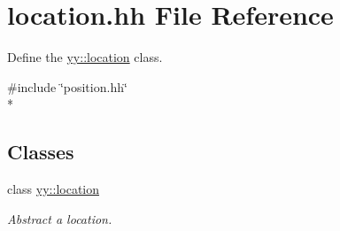 \hypertarget{location_8hh}{\section{location.\-hh File Reference}
\label{location_8hh}
}


Define the \hyperlink{classyy_1_1location}{yy\-::location} class.  


{\ttfamily \#include \char`\"{}position.\-hh\char`\"{}}\\*
\subsection*{Classes}
\begin{DoxyCompactItemize}
\item 
class \hyperlink{classyy_1_1location}{yy\-::location}
\begin{DoxyCompactList}\small\item\em Abstract a location. \end{DoxyCompactList}\end{DoxyCompactItemize}
